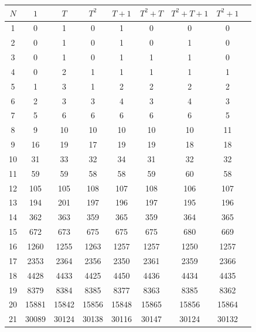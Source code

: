 \documentclass[10pt,reqno]{amsproc}
\newcommand{\1}{\mathds{1}}	%
\theoremstyle{definition}
\theoremstyle{remark}
\newcommand{\myg}[1]{\textcolor{mygreen}{#1}}
\newcommand{\myb}[1]{\textcolor{myblue}{#1}}
\newcommand{\myr}[1]{\textcolor{myred}{#1}}
\begin{document}
\begin{table}[h!]
\centering
\begin{tabular}{c|cccccccc}
\toprule
\textbf{$N$} & \textbf{$1$} & \textbf{$T$} & \textbf{$T^2$} & \textbf{$T+1$} & \textbf{$T^2+T$} & \textbf{$T^2+T+1$} & \textbf{$T^2+1$} \\
\midrule
1 & \myb{0} & \myg{1} & \myb{0} & \myg{1} & \myb{0} & \myb{0} & \myb{0} \\
2 & \myb{0} & \myg{1} & \myb{0} & \myg{1} & \myb{0} & \myg{1} & \myb{0} \\
3 & \myb{0} & \myg{1} & \myb{0} & \myg{1} & \myg{1} & \myg{1} & \myb{0} \\
4 & 0 & 2 & \myb{1} & \myb{1} & \myb{1} & \myb{1} & \myb{1} \\
5 & \myb{1} & 3 & \myb{1} & \myg{2} & \myg{2} & \myg{2} & \myg{2} \\
6 & 2 & \myb{3} & \myb{3} & \myg{4} & \myb{3} & \myg{4} & \myb{3} \\
7 & \myb{5} & \myg{6} & \myg{6} & \myg{6} & \myg{6} & \myg{6} & \myb{5} \\
8 & 9 & \myb{10} & \myb{10} & \myb{10} & \myb{10} & \myb{10} & 11 \\
9 & 16 & \myb{19} & 17 & \myb{19} & \myb{19} & \myg{18} & \myg{18} \\
10 & \myb{31} & 33 & \myg{32} & 34 & \myb{31} & \myg{32} & \myg{32} \\
11 & \myb{59} & \myb{59} & \myg{58} & \myg{58} & \myb{59} & 60 & \myg{58} \\
12 & \myb{105} & \myb{105} & \myg{108} & \myr{107} & \myg{108} & 106 & \myr{107} \\
13 & 194 & 201 & \myb{197} & \myg{196} & \myb{197} & 195 & \myg{196} \\
14 & 362 & 363 & \myb{359} & \myg{365} & \myb{359} & 364 & \myg{365} \\
15 & 672 & 673 & \myb{675} & \myb{675} & \myb{675} & 680 & 669 \\
16 & 1260 & 1255 & 1263 & \myb{1257} & \myb{1257} & 1250 & \myb{1257} \\
17 & 2353 & 2364 & 2356 & 2350 & 2361 & 2359 & 2366 \\
18 & 4428 & 4433 & 4425 & 4450 & 4436 & 4434 & 4435 \\
19 & 8379 & 8384 & \myb{8385} & 8377 & 8363 & \myb{8385} & 8362 \\
20 & 15881 & 15842 & \myb{15856} & 15848 & 15865 & \myb{15856} & 15864 \\
21 & 30089 & \myb{30124} & 30138 & 30116 & 30147 & \myb{30124} & 30132 \\

\end{tabular}
\end{table}
\end{document}
